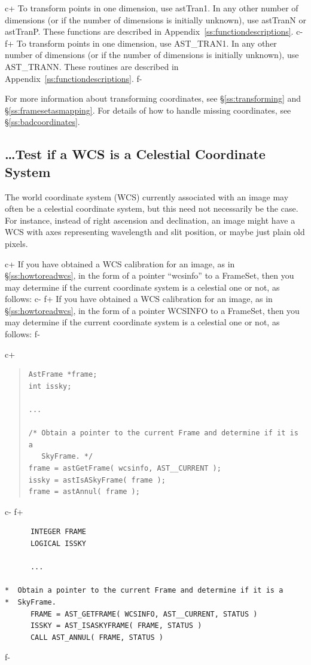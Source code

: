 \documentclass[twoside,11pt]{article}
\newcommand{\appref}[1]{Appendix~\ref{#1}}
\newcommand{\secref}[1]{\S\ref{#1}}
\newcommand{\appref}[1]{\ref{#1}}
\newcommand{\secref}[1]{\ref{#1}}
\begin{document}
c+
To transform points in one dimension, use astTran1. In any other
number of dimensions (or if the number of dimensions is initially
unknown), use astTranN or astTranP. These functions are described in
\appref{ss:functiondescriptions}.
c-
f+
To transform points in one dimension, use AST\_TRAN1. In any other
number of dimensions (or if the number of dimensions is initially
unknown), use AST\_TRANN. These routines are described in
\appref{ss:functiondescriptions}.
f-

For more information about transforming coordinates, see
\secref{ss:transforming} and \secref{ss:framesetasmapping}. For
details of how to handle missing coordinates, see
\secref{ss:badcoordinates}.

\subsection{\label{ss:howtotestforcelestial}\ldots Test if a WCS is a Celestial Coordinate System}

The world coordinate system (WCS) currently associated with an image
may often be a celestial coordinate system, but this need not
necessarily be the case. For instance, instead of right ascension and
declination, an image might have a WCS with axes representing
wavelength and slit position, or maybe just plain old pixels.

c+
If you have obtained a WCS calibration for an image, as in
\secref{ss:howtoreadwcs}, in the form of a pointer ``wcsinfo'' to a
FrameSet, then you may determine if the current coordinate system is a
celestial one or not, as follows:
c-
f+
If you have obtained a WCS calibration for an image, as in
\secref{ss:howtoreadwcs}, in the form of a pointer WCSINFO to a
FrameSet, then you may determine if the current coordinate system is a
celestial one or not, as follows:
f-

c+
\begin{quote}
\small
\begin{verbatim}
AstFrame *frame;
int issky;

...

/* Obtain a pointer to the current Frame and determine if it is a
   SkyFrame. */
frame = astGetFrame( wcsinfo, AST__CURRENT );
issky = astIsASkyFrame( frame );
frame = astAnnul( frame );
\end{verbatim}
\normalsize
\end{quote}
c-
f+
\small
\begin{verbatim}
      INTEGER FRAME
      LOGICAL ISSKY

      ...

*  Obtain a pointer to the current Frame and determine if it is a
*  SkyFrame.
      FRAME = AST_GETFRAME( WCSINFO, AST__CURRENT, STATUS )
      ISSKY = AST_ISASKYFRAME( FRAME, STATUS )
      CALL AST_ANNUL( FRAME, STATUS )
\end{verbatim}
\normalsize
f-
\end{document}
